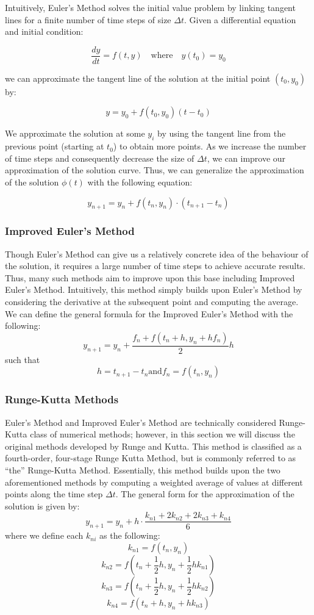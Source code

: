 \documentclass{article} %
\begin{document}
\begin{multicols}{2}
Intuitively, Euler's Method solves the initial value problem by linking tangent lines for a finite number of time steps of size $\Delta t$.
Given a differential equation and initial condition:

\[
    \frac{dy}{dt} = f(t, y) \quad \text{where} \quad y(t_{0}) = y_{0}
\]

we can approximate the tangent line of the solution at the initial point $(t_{0}, y_{0})$ by:

\[
    y = y_{0} + f(t_{0}, y_{0})(t - t_{0})
\]

We approximate the solution at some $y_{i}$ by using the tangent line from the previous point (starting at $t_{0}$) to obtain more points.
As we increase the number of time steps and consequently decrease the size of $\Delta t$, we can improve our approximation of the solution curve.
Thus, we can generalize the approximation of the solution $\phi(t)$ with the following equation:

\[
    y_{n+1} = y_{n} + f(t_{n}, y_{n}) \cdot (t_{n+1} - t_{n})
\]

\subsubsection{Improved Euler's Method}
\label{subsubsec:improved_euler_method} %

Though Euler's Method can give us a relatively concrete idea of the behaviour of the solution, it requires a large number of time steps to achieve accurate results.
Thus, many such methods aim to improve upon this base including Improved Euler's Method.
Intuitively, this method simply builds upon Euler's Method by considering the derivative at the subsequent point and computing the average.
We can define the general formula for the Improved Euler's Method with the following:
\[
    y_{n+1} = y_{n} + \frac{f_{n} + f(t_{n} + h, y_{n} + hf_{n})}{2}h
\]
such that 
\[
    h = t_{n + 1} - t_{n} \text{and} f_{n} = f(t_{n}, y_{n})
\]

\subsubsection{Runge-Kutta Methods}
\label{subsubsec:runge_kutta}

Euler's Method and Improved Euler's Method are technically considered Runge-Kutta class of numerical methods; however, in this section we will discuss the original methods developed by Runge and Kutta.
This method is classified as a fourth-order, four-stage Runge Kutta Method, but is commonly referred to as ``the'' Runge-Kutta Method.
Essentially, this method builds upon the two aforementioned methods by computing a weighted average of values at different points along the time step $\Delta t$.
The general form for the approximation of the solution is given by:
\[
    y_{n+1} = y_{n} + h \cdot \frac{k_{n1} + 2k_{n2} + 2k_{n3} + k_{n4}}{6}
\]
where we define each $k_{ni}$ as the following:
\[
    k_{n1} = f(t_{n}, y_{n})
\]
\[
    k_{n2} = f\left(t_{n} + \frac{1}{2}h, y_{n} + \frac{1}{2}hk_{n1}\right)
\]
\[
    k_{n3} = f\left(t_{n} + \frac{1}{2}h, y_{n} + \frac{1}{2}hk_{n2}\right)
\]
\[
    k_{n4} = f(t_{n} + h, y_{n} + hk_{n3})
\]


\end{multicols}
\end{document}
